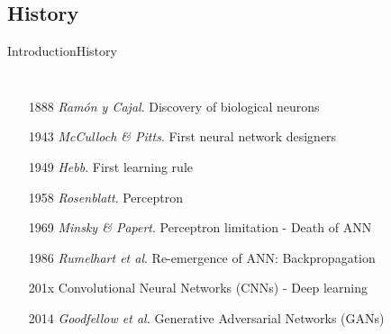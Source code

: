 \documentclass[10pt,compress]{beamer} %
\begin{document}
\subsection{History}
\begin{frame}{Introduction}{History}
    \begin{columns}

	\begin{itemize}
	\item[1888] \textit{Ramón y Cajal}. Discovery of biological neurons
	\item[1943] \textit{McCulloch \& Pitts}. First neural network designers
	\item[1949] \textit{Hebb}. First learning rule
	\item[1958] \textit{Rosenblatt}. Perceptron
	\item[1969] \textit{Minsky \& Papert}.  Perceptron limitation - Death of ANN
	\item[1986] \textit{Rumelhart et al}. Re-emergence of ANN: Backpropagation
	\item[201x] Convolutional Neural Networks (CNNs) - Deep learning
	\item[2014] \textit{Goodfellow et al.} Generative Adversarial Networks (GANs)
	\end{itemize}


\end{columns}
\end{frame}
\end{document}
